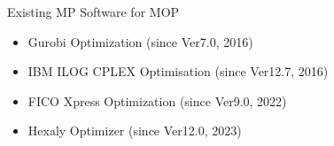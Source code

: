 \documentclass[]{beamer}
\begin{document}
\begin{frame}{Existing MP Software for MOP}
{\begin{itemize}
\item Gurobi Optimization \hfill (since Ver7.0, 2016)\vspace{-1mm}\\

\item IBM ILOG CPLEX Optimisation \hfill (since Ver12.7, 2016)\vspace{-1mm}\\

\item FICO Xpress Optimization \hfill (since Ver9.0, 2022)\vspace{-1mm}\\

\item Hexaly Optimizer \hfill (since Ver12.0, 2023)\vspace{-1mm}\\

\end{itemize}
}

\end{frame}


% 
%
\end{document}
